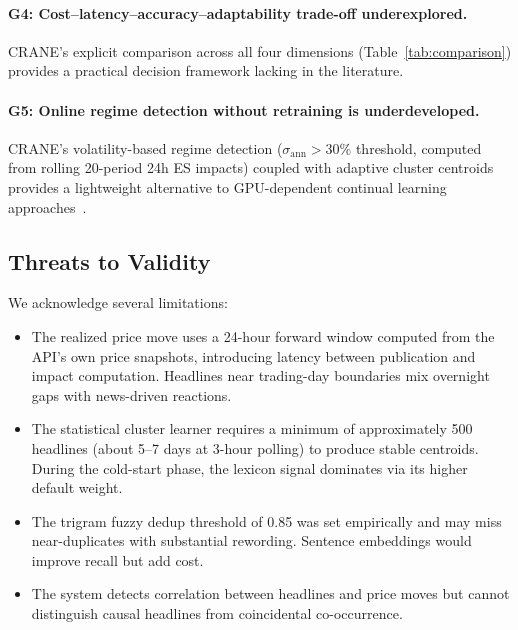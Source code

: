 \paragraph{G4: Cost--latency--accuracy--adaptability trade-off underexplored.} CRANE's explicit comparison across all four dimensions (Table~\ref{tab:comparison}) provides a practical decision framework lacking in the literature.

\paragraph{G5: Online regime detection without retraining is underdeveloped.} CRANE's volatility-based regime detection ($\sigma_{\text{ann}} > 30\%$ threshold, computed from rolling 20-period 24h ES impacts) coupled with adaptive cluster centroids provides a lightweight alternative to GPU-dependent continual learning approaches~\cite{song2025adapter}.

\subsection{Threats to Validity}

We acknowledge several limitations:

\begin{itemize}
    \item The realized price move uses a 24-hour forward window computed from the API's own price snapshots, introducing latency between publication and impact computation. Headlines near trading-day boundaries mix overnight gaps with news-driven reactions.
    \item The statistical cluster learner requires a minimum of approximately 500 headlines (about 5--7 days at 3-hour polling) to produce stable centroids. During the cold-start phase, the lexicon signal dominates via its higher default weight.
    \item The trigram fuzzy dedup threshold of 0.85 was set empirically and may miss near-duplicates with substantial rewording. Sentence embeddings would improve recall but add cost.
    \item The system detects correlation between headlines and price moves but cannot distinguish causal headlines from coincidental co-occurrence.
\end{itemize}

